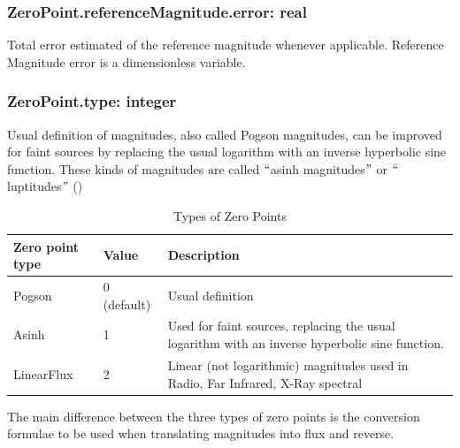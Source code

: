 \documentclass[11pt,a4paper]{ivoa}
\begin{document}
\subsubsection{ZeroPoint.referenceMagnitude.error: real}
Total error estimated of the reference magnitude whenever applicable. Reference 
Magnitude error is a dimensionless variable.\par

\subsubsection{ZeroPoint.type: integer}
Usual definition of magnitudes, also called Pogson magnitudes, can be improved 
for faint sources by replacing the usual logarithm with an inverse hyperbolic 
sine function. These kinds of magnitudes are called $``$asinh magnitudes$"$  
or $``$luptitudes$"$  (\citep{2004A&A...422..205G})\par



\begin{table}[ht]
 			\centering
\begin{tabular}{p{2.42in}p{0.8in}p{1.55in}}
\hline
\multicolumn{1}{|p{2.42in}}{Zero point type} &
\multicolumn{1}{|p{0.8in}}{Value} &
\multicolumn{1}{|p{1.55in}|}{Description} \\
\hline
\multicolumn{1}{|p{2.42in}}{Pogson} &
\multicolumn{1}{|p{0.8in}}{0 (default)} &
\multicolumn{1}{|p{1.55in}|}{Usual definition} \\
\hline
\multicolumn{1}{|p{2.42in}}{Asinh} &
\multicolumn{1}{|p{0.8in}}{1} &
\multicolumn{1}{|p{1.55in}|}{Used for faint sources, replacing the usual 
logarithm with an inverse hyperbolic sine function.} \\
\hline
\multicolumn{1}{|p{2.42in}}{LinearFlux} &
\multicolumn{1}{|p{0.8in}}{2} &
\multicolumn{1}{|p{1.55in}|}{Linear (not logarithmic) magnitudes used in 
Radio, Far Infrared, X-Ray spectral } \\
\hline
\end{tabular}
\caption{Types of Zero Points}
 \end{table}



The main difference between the three types of zero points is the 
conversion formulae to be used when translating magnitudes into flux and 
reverse.\par
\end{document}
